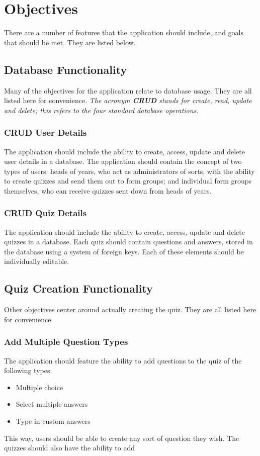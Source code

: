 \section{Objectives}
There are a number of features that the application should include, and goals that should be met. They are listed below.

\subsection{Database Functionality}
Many of the objectives for the application relate to database usage. They are all listed here for convenience. \textit{The acronym \textbf{CRUD} stands for create, read, update and delete; this refers to the four standard database operations.}

\subsubsection{CRUD User Details}
The application should include the ability to create, access, update and delete user details in a database. The application should contain the concept of two types of users: heads of years, who act as administrators of sorts, with the ability to create quizzes and send them out to form groups; and individual form groups themselves, who can receive quizzes sent down from heads of years.

\subsubsection{CRUD Quiz Details}
The application should include the ability to create, access, update and delete quizzes in a database. Each quiz should contain questions and answers, stored in the database using a system of foreign keys. Each of these elements should be individually editable.

\subsection{Quiz Creation Functionality}
Other objectives center around actually creating the quiz. They are all listed here for convenience.

\subsubsection{Add Multiple Question Types} 
The application should feature the ability to add questions to the quiz of the following types:

\begin{itemize}
\item Multiple choice
\item Select multiple answers
\item Type in custom answers
\end{itemize}

This way, users should be able to create any sort of question they wish. The quizzes should also have the ability to add 
